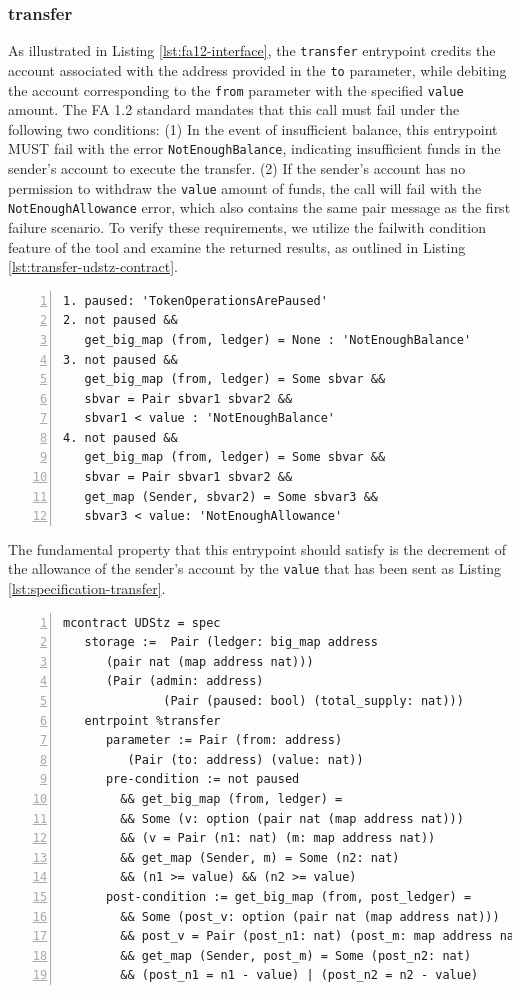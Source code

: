 \documentclass[a4paper,UKenglish,cleveref, autoref, thm-restate]{lipics-v2021}
\begin{document}
\subsubsection{transfer}
As illustrated in Listing \ref{lst:fa12-interface}, the \lstinline/transfer/ entrypoint credits the account associated with the address provided in the \lstinline/to/ parameter, while debiting the account corresponding to the \lstinline/from/ parameter with the specified \lstinline/value/ amount. The FA 1.2 standard mandates that this call must fail under the following two conditions: (1) In the event of insufficient balance, this entrypoint MUST fail with the error \lstinline/NotEnoughBalance/, indicating insufficient funds in the sender's account to execute the transfer. (2) If the sender's account has no permission to withdraw the \lstinline/value/ amount of funds, the call will fail with the \lstinline/NotEnoughAllowance/ error, which also contains the same pair message as the first failure scenario. To verify these requirements, we utilize the failwith condition feature of the tool and examine the returned results, as outlined in Listing \ref{lst:transfer-udstz-contract}.  
\begin{lstlisting}[float,captionpos=b,caption={Fail conditions for the \lstinline/transfer/ entrypoint},label={lst:transfer-udstz-contract},numbers=left]
1. paused: 'TokenOperationsArePaused'
2. not paused &&
   get_big_map (from, ledger) = None : 'NotEnoughBalance'
3. not paused &&
   get_big_map (from, ledger) = Some sbvar &&
   sbvar = Pair sbvar1 sbvar2 &&
   sbvar1 < value : 'NotEnoughBalance'
4. not paused &&
   get_big_map (from, ledger) = Some sbvar &&
   sbvar = Pair sbvar1 sbvar2 &&
   get_map (Sender, sbvar2) = Some sbvar3 &&
   sbvar3 < value: 'NotEnoughAllowance'
\end{lstlisting}
The fundamental property that this entrypoint should satisfy is the decrement of the allowance of the sender's account by the \lstinline/value/ that has been sent as Listing \ref{lst:specification-transfer}.
\begin{lstlisting}[float,captionpos=b,caption={Specification for the \lstinline/transfer/ entrypoint},label={lst:specification-transfer},numbers=left]
mcontract UDStz = spec 
   storage :=  Pair (ledger: big_map address 
      (pair nat (map address nat))) 
      (Pair (admin: address) 
              (Pair (paused: bool) (total_supply: nat)))
   entrpoint %transfer
      parameter := Pair (from: address)
         (Pair (to: address) (value: nat))
      pre-condition := not paused 
        && get_big_map (from, ledger) = 
        && Some (v: option (pair nat (map address nat))) 
        && (v = Pair (n1: nat) (m: map address nat))
        && get_map (Sender, m) = Some (n2: nat) 
        && (n1 >= value) && (n2 >= value)
      post-condition := get_big_map (from, post_ledger) = 
        && Some (post_v: option (pair nat (map address nat))) 
        && post_v = Pair (post_n1: nat) (post_m: map address nat) 
        && get_map (Sender, post_m) = Some (post_n2: nat) 
        && (post_n1 = n1 - value) | (post_n2 = n2 - value)
\end{lstlisting}
\end{document}
